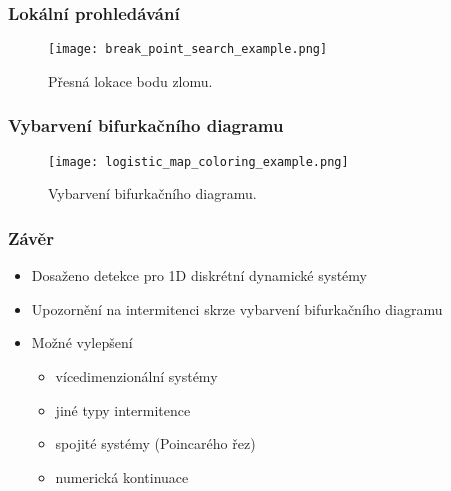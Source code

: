 \documentclass[lualatex,hyperref={pdfencoding=auto}]{beamer}
\begin{document}
\begin{frame}
    \frametitle{Lokální prohledávání}
    
    \begin{figure}[!h]
        \centering
        \texttt{[image: break\_point\_search\_example.png]}
        \caption{Přesná lokace bodu zlomu.}
    \end{figure}

\end{frame}


\begin{frame}
    \frametitle{Vybarvení bifurkačního diagramu}
    
\begin{figure}[!h]
    \centering
    \texttt{[image: logistic\_map\_coloring\_example.png]}
    \caption{Vybarvení bifurkačního diagramu.}
\end{figure}

\end{frame}


\begin{frame}
    \frametitle{Závěr}

\begin{itemize}
    \item Dosaženo detekce pro 1D diskrétní dynamické systémy
    \item Upozornění na intermitenci skrze vybarvení bifurkačního diagramu
    \item Možné vylepšení
    \begin{itemize}
        \item vícedimenzionální systémy
        \item jiné typy intermitence
        \item spojité systémy (Poincarého řez)
        \item numerická kontinuace
    \end{itemize}
\end{itemize}

    
\end{frame}
\end{document}
